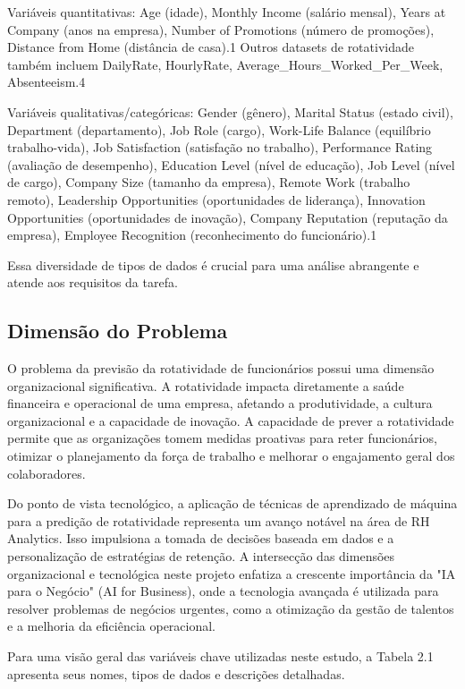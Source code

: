 \documentclass[sigconf]{acmart}
\begin{document}
Variáveis quantitativas: Age (idade), Monthly Income (salário mensal), Years at Company (anos na empresa), Number of Promotions (número de promoções), Distance from Home (distância de casa).1 Outros datasets de rotatividade também incluem DailyRate, HourlyRate, Average\_Hours\_Worked\_Per\_Week, Absenteeism.4

Variáveis qualitativas/categóricas: Gender (gênero), Marital Status (estado civil), Department (departamento), Job Role (cargo), Work-Life Balance (equilíbrio trabalho-vida), Job Satisfaction (satisfação no trabalho), Performance Rating (avaliação de desempenho), Education Level (nível de educação), Job Level (nível de cargo), Company Size (tamanho da empresa), Remote Work (trabalho remoto), Leadership Opportunities (oportunidades de liderança), Innovation Opportunities (oportunidades de inovação), Company Reputation (reputação da empresa), Employee Recognition (reconhecimento do funcionário).1

Essa diversidade de tipos de dados é crucial para uma análise abrangente e atende aos requisitos da tarefa.

\subsection{Dimensão do Problema}
O problema da previsão da rotatividade de funcionários possui uma dimensão organizacional significativa. A rotatividade impacta diretamente a saúde financeira e operacional de uma empresa, afetando a produtividade, a cultura organizacional e a capacidade de inovação. A capacidade de prever a rotatividade permite que as organizações tomem medidas proativas para reter funcionários, otimizar o planejamento da força de trabalho e melhorar o engajamento geral dos colaboradores.

Do ponto de vista tecnológico, a aplicação de técnicas de aprendizado de máquina para a predição de rotatividade representa um avanço notável na área de RH Analytics. Isso impulsiona a tomada de decisões baseada em dados e a personalização de estratégias de retenção. A intersecção das dimensões organizacional e tecnológica neste projeto enfatiza a crescente importância da "IA para o Negócio" (AI for Business), onde a tecnologia avançada é utilizada para resolver problemas de negócios urgentes, como a otimização da gestão de talentos e a melhoria da eficiência operacional.

Para uma visão geral das variáveis chave utilizadas neste estudo, a Tabela 2.1 apresenta seus nomes, tipos de dados e descrições detalhadas.
\end{document}
